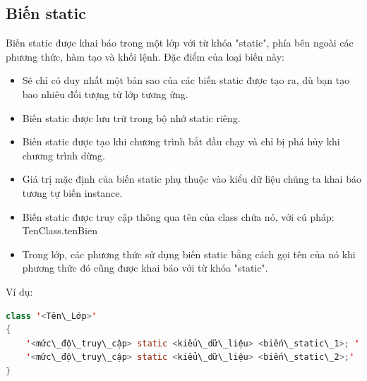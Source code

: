 \subsection{Biến static}
\indent Biến static được khai báo trong một lớp với từ khóa {\ttfamily "static"}, phía bên ngoài các phương thức, hàm tạo và khối lệnh. Đặc điểm của loại biến này:
\begin{itemize}
\item Sẽ chỉ có duy nhất một bản sao của các biến static được tạo ra, dù bạn tạo bao nhiêu đối tượng từ lớp tương ứng.
\item Biến static được lưu trữ trong bộ nhớ static riêng.
\item Biến static được tạo khi chương trình bắt đầu chạy và chỉ bị phá hủy khi chương trình dừng.
\item Giá trị mặc định của biến static phụ thuộc vào kiểu dữ liệu chúng ta khai báo tương tự biến instance.
\item Biến static được truy cập thông qua tên của class chứa nó, với cú pháp: TenClass.tenBien
\item Trong lớp, các phương thức sử dụng biến static bằng cách gọi tên của nó khi phương thức đó cũng được khai báo với từ khóa {\ttfamily "static"}.
\end{itemize}
\indent Ví dụ:
\begin{lstlisting}[escapechar=',language=java]	
class '<Tên\_Lớp>' 
{ 
	'<mức\_độ\_truy\_cập> static <kiểu\_dữ\_liệu> <biến\_static\_1>; '
	'<mức\_độ\_truy\_cập> static <kiểu\_dữ\_liệu> <biến\_static\_2>;'
}
\end{lstlisting}

